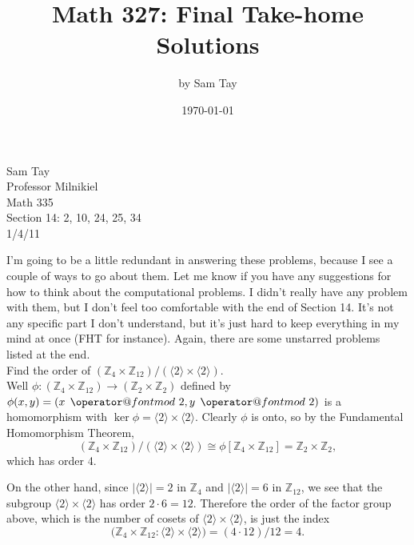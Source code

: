 \documentclass{article}
\title{Math 327: Final Take-home Solutions}
\author{by Sam Tay}
\date{\today}
\makeatletter
\newenvironment{problem1}[1]{\noindent {\bf Problem #1:}}
{\medskip}
\def\imod#1{\allowbreak\mkern8mu{\operator@font mod}\,\,#1}
\makeatother
\begin{document}
\begin{flushright}Sam Tay\\ Professor Milnikiel \\ Math 335 \\ Section 14: 2, 10, 24, 25, 34\\ 1/4/11
\end{flushright}


I'm going to be a little redundant in answering these problems, because I see a couple of ways to go about them. Let me know if you have any suggestions for how to think about the computational problems. I didn't really have any problem with them, but I don't feel too comfortable with the end of Section 14. It's not any specific part I don't understand, but it's just hard to keep everything in my mind at once (FHT for instance). Again, there are some unstarred problems listed at the end.\\

\begin{problem1}{2} Find the order of $(\mathbb{Z}_4 \times \mathbb{Z}_{12}) / ( \langle 2 \rangle \times \langle 2 \rangle )$.\\

Well $\phi: (\mathbb{Z}_4 \times \mathbb{Z}_{12}) \to (\mathbb{Z}_2 \times \mathbb{Z}_2)$ defined by $\phi(x,y)=(x\imod{2},y\imod{2})$ is a homomorphism with $\ker\phi=\langle 2 \rangle \times \langle 2 \rangle$. Clearly $\phi$ is onto, so by the Fundamental Homomorphism Theorem,
 $$(\mathbb{Z}_4 \times \mathbb{Z}_{12}) / ( \langle 2 \rangle \times \langle 2 \rangle ) \cong \phi[\mathbb{Z}_4 \times \mathbb{Z}_{12}]=\mathbb{Z}_2 \times \mathbb{Z}_2,$$ which has order 4.
 
 On the other hand, since $| \langle 2 \rangle | = 2 $ in $\mathbb{Z}_4$ and $| \langle 2 \rangle | = 6 $ in $\mathbb{Z}_{12}$, we see that the subgroup $\langle 2 \rangle \times \langle 2 \rangle$ has order $2\cdot6=12$. Therefore the order of the factor group above, which is the number of cosets of $\langle 2 \rangle \times \langle 2 \rangle $, is just the index $$  \big(\mathbb{Z}_4 \times \mathbb{Z}_{12}: \langle 2 \rangle \times \langle 2 \rangle\big ) = (4\cdot12)/12=4.$$
\end{problem1}
\end{document}
